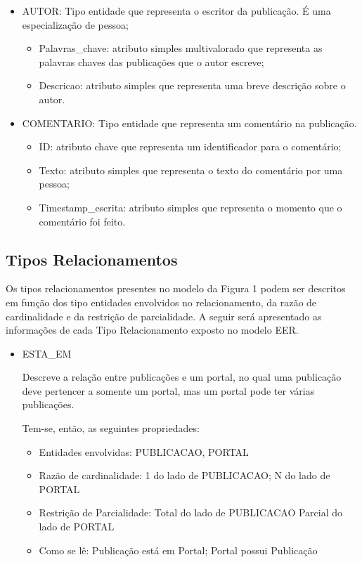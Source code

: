 \begin{itemize}
\item AUTOR: Tipo entidade que representa o escritor da publicação. É uma especialização de pessoa;
				\begin{itemize}
\item Palavras\_chave: atributo simples multivalorado que representa as palavras chaves das publicações que o autor escreve;
\item Descricao: atributo simples que representa uma breve descrição sobre o autor.
				\end{itemize}
				\end{itemize}
				\begin{itemize}
\item COMENTARIO: Tipo entidade que representa um comentário na publicação.
				\begin{itemize}
\item ID: atributo chave que representa um identificador para o comentário;
\item Texto: atributo simples que representa o texto do comentário por uma pessoa;
\item Timestamp\_escrita: atributo simples que representa o momento que o comentário foi feito.
				\end{itemize}
				\end{itemize}
\subsection{Tipos Relacionamentos}

Os tipos relacionamentos presentes no modelo da Figura 1 podem ser descritos em função dos tipo entidades envolvidos no relacionamento, da razão de cardinalidade e da restrição de parcialidade. A seguir será apresentado as informações de cada Tipo Relacionamento exposto no modelo EER.

\begin{itemize}
				
\item ESTA\_EM

Descreve a relação entre publicações e um portal, no qual uma publicação deve pertencer a somente um portal, mas um portal pode ter várias publicações.

Tem-se, então, as seguintes propriedades:

\begin{itemize}

\item Entidades envolvidas: PUBLICACAO, PORTAL
\item Razão de cardinalidade: 1 do lado de PUBLICACAO; N do lado de PORTAL
\item Restrição de Parcialidade: Total do lado de PUBLICACAO                        Parcial do lado de PORTAL
\item Como se lê: Publicação está em Portal; Portal possui Publicação
\end{itemize}
\end{itemize}

